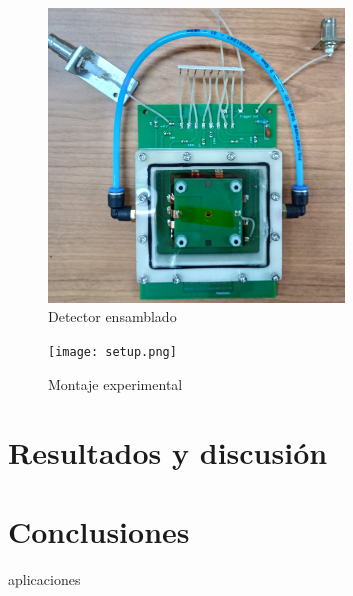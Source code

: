 \documentclass{article}
\begin{document}
\begin{figure}[H]
    \centering
    \includegraphics[width=0.7\textwidth]{ensamblado.jpg}
    \caption{Detector ensamblado}
    \label{fig:ensamblado}
\end{figure}

\begin{figure}[H]
    \centering
    \texttt{[image: setup.png]}
    \caption{Montaje experimental}
    \label{fig:setup}
\end{figure}


\newpage

\section{Resultados y discusión}
\newpage

\section{Conclusiones}
\newpage



\noindent aplicaciones


\newpage



\end{document}
